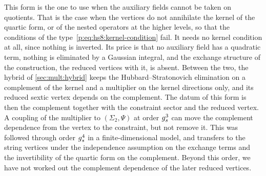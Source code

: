 This form is the one to use when the auxiliary fields cannot be taken on quotients.
That is the case when the vertices do not annihilate the kernel of the quartic form, or of the nested operators at the higher levels, so that the conditions of the type~\eqref{p:eq:hs8:kernel-condition} fail.
It needs no kernel condition at all, since nothing is inverted.
Its price is that no auxiliary field has a quadratic term, nothing is eliminated by a Gaussian integral, and the exchange structure of the construction, the reduced vertices with it, is absent.
Between the two, the hybrid of \cref{sec:mult:hybrid} keeps the Hubbard--Stratonovich elimination on a complement of the kernel and a multiplier on the kernel directions only, and its reduced sextic vertex depends on the complement.
The datum of this form is then the complement together with the constraint sector and the reduced vertex.
A coupling of the multiplier to $(\Sigma_2, \Psi)$ at order $g_s^3$ can move the complement dependence from the vertex to the constraint, but not remove it.
This was followed through order $g_s^4$ in a finite-dimensional model, and transfers to the string vertices under the independence assumption on the exchange terms and the invertibility of the quartic form on the complement.
Beyond this order, we have not worked out the complement dependence of the later reduced vertices.
